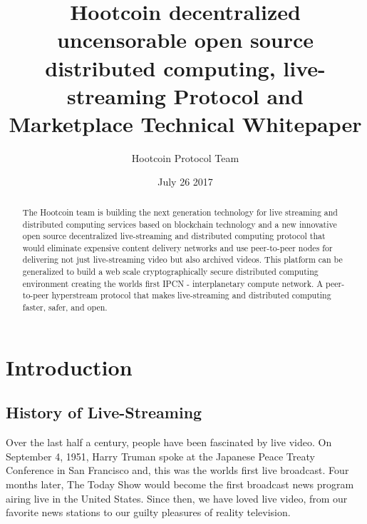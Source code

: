 \documentclass{article}
\title{Hootcoin decentralized uncensorable open source distributed computing, live-streaming Protocol and Marketplace Technical Whitepaper}
\author{Hootcoin Protocol Team}
\date{July 26 2017}
\begin{document}
\maketitle

\begin{abstract}
The Hootcoin team is building the next generation technology for live streaming and distributed computing services based on blockchain technology and a new innovative open source decentralized live-streaming and distributed computing protocol that would eliminate expensive content delivery networks and use peer-to-peer nodes for delivering not just live-streaming video but also archived videos. This platform can be generalized to build a web scale cryptographically secure distributed computing environment creating the worlds first IPCN - interplanetary compute network. A peer-to-peer hyperstream protocol that makes live-streaming and distributed computing faster, safer, and open.

\end{abstract}
\newpage

\tableofcontents
\newpage

\section{Introduction}
\subsection{History of Live-Streaming}
Over the last half a century, people have been fascinated by live video. On September 4, 1951, Harry Truman spoke at the Japanese Peace Treaty Conference in San Francisco and, this was the worlds first live broadcast. Four months later, The Today Show would become the first broadcast news program airing live in the United States. Since then, we have loved live video, from our favorite news stations to our guilty pleasures of reality television.

\end{document}
